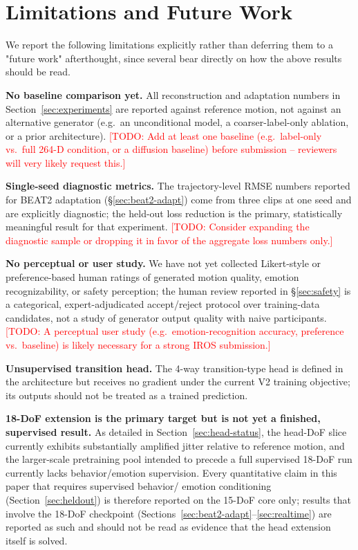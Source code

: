 \documentclass[conference]{IEEEtran}
\newcommand{\todo}[1]{\textcolor{red}{[TODO: #1]}}
\begin{document}
\section{Limitations and Future Work}
\label{sec:limitations}

We report the following limitations explicitly rather than deferring
them to a "future work" afterthought, since several bear directly on
how the above results should be read.

\textbf{No baseline comparison yet.} All reconstruction and
adaptation numbers in Section~\ref{sec:experiments} are reported
against reference motion, not against an alternative generator (e.g.\
an unconditional model, a coarser-label-only ablation, or a prior
architecture). \todo{Add at least one baseline (e.g.\ label-only vs.\
full 264-D condition, or a diffusion baseline) before submission --
reviewers will very likely request this.}

\textbf{Single-seed diagnostic metrics.} The trajectory-level RMSE
numbers reported for BEAT2 adaptation (\S\ref{sec:beat2-adapt}) come
from three clips at one seed and are explicitly diagnostic; the
held-out loss reduction is the primary, statistically meaningful
result for that experiment. \todo{Consider expanding the diagnostic
sample or dropping it in favor of the aggregate loss numbers only.}

\textbf{No perceptual or user study.} We have not yet collected
Likert-style or preference-based human ratings of generated motion
quality, emotion recognizability, or safety perception; the human
review reported in \S\ref{sec:safety} is a categorical,
expert-adjudicated accept/reject protocol over training-data
candidates, not a study of generator output quality with naive
participants. \todo{A perceptual user study (e.g.\ emotion-recognition
accuracy, preference vs.\ baseline) is likely necessary for a strong
IROS submission.}

\textbf{Unsupervised transition head.} The 4-way transition-type head
is defined in the architecture but receives no gradient under the
current V2 training objective; its outputs should not be treated as a
trained prediction.

\textbf{18-DoF extension is the primary target but is not yet a
finished, supervised result.} As detailed in
Section~\ref{sec:head-status}, the head-DoF slice currently exhibits
substantially amplified jitter relative to reference motion, and the
larger-scale pretraining pool intended to precede a full supervised
18-DoF run currently lacks behavior/emotion supervision. Every
quantitative claim in this paper that requires supervised behavior/
emotion conditioning (Section~\ref{sec:heldout}) is therefore
reported on the 15-DoF core only; results that involve the 18-DoF
checkpoint (Sections~\ref{sec:beat2-adapt}--\ref{sec:realtime}) are reported as such
and should not be read as evidence that the head extension itself is
solved.
\end{document}
